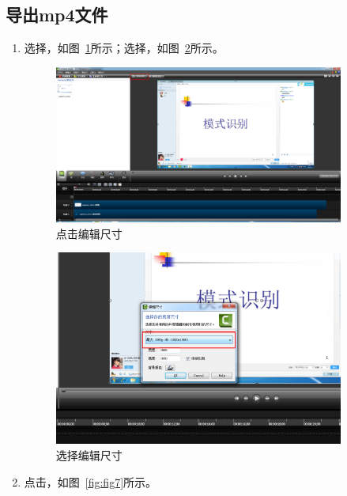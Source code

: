 \documentclass[12pt]{article}
\begin{document}
\subsection{导出mp4文件}\label{sec:daochu}
\begin{enumerate}
\item 选择{\color{blue}{编辑尺寸}}，如图~\ref{fig:fig5}所示；选择{\color{blue}{1080p}}，如图~\ref{fig:fig6}所示。\par
    \begin{figure}[!ht]
    \centering
    \includegraphics[width=0.9\textwidth]{fig5.png}
    \caption{点击编辑尺寸}
    \label{fig:fig5}
    \end{figure}
    \begin{figure}
    \centering
    \includegraphics[width=0.9\textwidth]{fig6.png}
    \caption{选择编辑尺寸}
    \label{fig:fig6}
    \end{figure}
\item 点击{\color{blue}{生成与分享}}，如图~\ref{fig:fig7}所示。\par
     \begin{figure}

\end{figure}
\end{enumerate}
\end{document}
